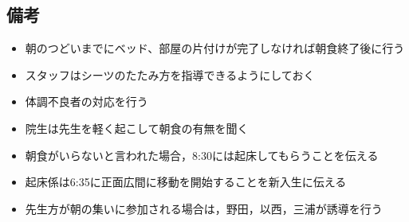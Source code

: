\subsection{備考}
\begin{itemize}
\item 朝のつどいまでにベッド、部屋の片付けが完了しなければ朝食終了後に行う
\item スタッフはシーツのたたみ方を指導できるようにしておく
\item 体調不良者の対応を行う
\item 院生は先生を軽く起こして朝食の有無を聞く
\item 朝食がいらないと言われた場合，8:30には起床してもらうことを伝える
\item 起床係は6:35に正面広間に移動を開始することを新入生に伝える
\item 先生方が朝の集いに参加される場合は，野田，以西，三浦が誘導を行う

\end{itemize}

%
